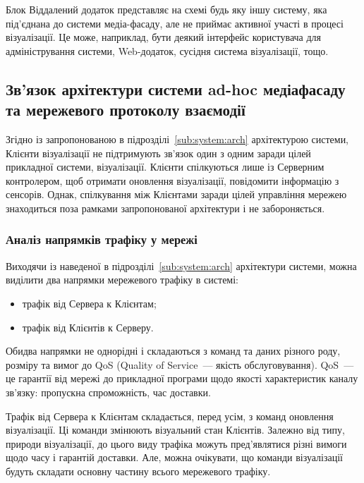 \documentclass[a4paper,ukrainian,utf8,nocolumnsxix,floatsection,equationsection]{eskdtext}
\renewcommand\paragraph{\subsubsection}
\begin{document}
Блок Віддалений додаток представляє на схемі будь яку іншу систему, яка під’єднана до системи медіа-фасаду, але не приймає активної участі в процесі візуалізації. Це може, наприклад, бути деякий інтерфейс користувача для адміністрування системи, Web-додаток, сусідня система візуалізації, тощо.

\subsection{Зв’язок архітектури системи ad-hoc медіафасаду та мережевого протоколу взаємодії}

Згідно із запропонованою в підрозділі~\ref{sub:system:arch} архітектурою системи, Клієнти візуалізації не підтримують зв’язок один з одним заради цілей прикладної системи, візуалізації. Клієнти спілкуються лише із Серверним контролером, щоб отримати оновлення візуалізації, повідомити інформацію з сенсорів. Однак, спілкування між Клієнтами заради цілей управління мережею знаходиться поза рамками запропонованої архітектури і не забороняється.

\paragraph{Аналіз напрямків трафіку у мережі}
\label{par:traffic:cases}

Виходячи із наведеної в підрозділі~\ref{sub:system:arch} архітектури системи, можна виділити два напрямки мережевого трафіку в системі:
\begin{itemize}
	\item трафік від Сервера к Клієнтам;
	\item трафік від Клієнтів к Серверу.
\end{itemize}

Обидва напрямки не однорідні і складаються з команд та даних різного роду, розміру та вимог до QoS (Quality of Service~--- якість обслуговування). QoS~--- це гарантії від мережі до прикладної програми щодо якості характеристик каналу зв’язку: пропускна спроможність, час доставки.

Трафік від Сервера к Клієнтам складається, перед усім, з команд оновлення візуалізації. Ці команди змінюють візуальний стан Клієнтів. Залежно від типу, природи візуалізації, до цього виду трафіка можуть пред’являтися різні вимоги щодо часу і гарантій доставки. Але, можна очікувати, що команди візуалізації будуть складати основну частину всього мережевого трафіку.
\end{document}
